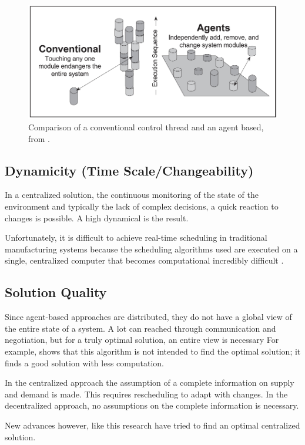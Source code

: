 \begin{figure}[h]
\centering
\includegraphics[width=0.7\linewidth]{img/modularity+decentral-changeability}
\caption{Comparison of a conventional control thread and an agent based, from \citep{parunak1999industrial}.}
\label{fig:modularitydecentral-changeability}
\end{figure}



\subsection{Dynamicity (Time Scale/Changeability)}
In a centralized solution, the continuous monitoring of the state of the environment and typically the lack of complex decisions, a quick reaction to changes is possible. A high dynamical is the result. 

Unfortunately, it is difficult to achieve real-time scheduling in traditional manufacturing systems because the scheduling algorithms used are executed on a single, centralized computer that becomes computational incredibly difficult \citep{duffie1994real}.
\subsection{Solution Quality}
Since agent-based approaches are distributed, they do not have a global view of the entire state of a system. A lot can reached through communication and negotiation, but for a truly optimal solution, an entire view is necessary For example,  \citep{palmer2003decentralized} shows that this algorithm is not intended to find the optimal solution; it finds a good solution with less computation. 

In the centralized approach the assumption of a complete information on supply and demand is made. This requires rescheduling to adapt with changes. In the decentralized approach, no assumptions on the complete information is necessary. 

New advances however, like this research have tried to find an optimal centralized solution. 


